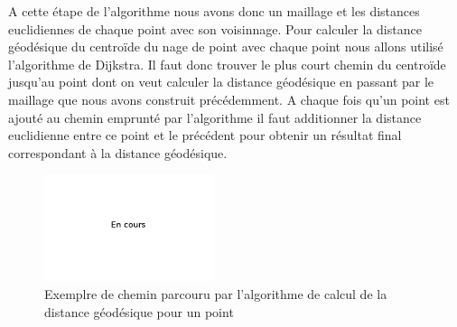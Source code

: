 
A cette étape de l'algorithme nous avons donc un maillage et les distances euclidiennes de chaque point avec son voisinnage. Pour calculer
la distance géodésique du centroïde du nage de point avec chaque point nous allons utilisé l'algorithme de Dijkstra\cite{dijkstra}.
Il faut donc trouver le plus court chemin du centroïde jusqu'au point dont on veut calculer la distance géodésique en passant par le
maillage que nous avons construit précédemment. A chaque fois qu'un point est ajouté au chemin emprunté par l'algorithme il faut 
additionner la distance euclidienne entre ce point et le précédent pour obtenir un résultat final correspondant à la distance 
géodésique.\\

\begin{figure}[!ht]
  \begin{center}
    \includegraphics[width=5cm]{image/wait.png}
    \caption{Exemplre de chemin parcouru par l'algorithme de calcul de la distance géodésique pour un point}
    \label{fig:cheminGeodesique}
  \end{center}
\end{figure}

